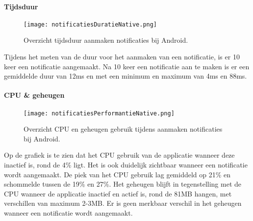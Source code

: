 \paragraph{Tijdsduur}
\begin{figure}[H]
    \centering
    \texttt{[image: notificatiesDuratieNative.png]}
    \caption{Overzicht tijdsduur aanmaken notificaties bij Android.}
\end{figure}
Tijdens het meten van de duur voor het aanmaken van een notificatie, is er 
10 keer een notificatie aangemaakt. Na 10 keer een notificatie aan te maken is er  
een gemiddelde duur van 12ms en met een minimum en 
maximum van 4ms en 88ms.

\paragraph{CPU \& geheugen}
\begin{figure}[H]
    \centering
    \texttt{[image: notificatiesPerformantieNative.png]}
    \caption{Overzicht CPU en geheugen gebruik tijdens aanmaken notificaties bij Android.}
\end{figure}
Op de grafiek is te zien dat het CPU gebruik van de applicatie wanneer deze inactief is, rond de 4\% ligt. 
Het is ook duidelijk zichtbaar wanneer een notificatie wordt aangemaakt. De piek van het CPU gebruik lag 
gemiddeld op 21\% en schommelde tussen de 19\% en 27\%. Het geheugen blijft in tegenstelling met de CPU 
wanneer de applicatie inactief en actief is, rond de 81MB hangen, met verschillen van maximum 2-3MB. Er is geen 
merkbaar verschil in het geheugen wanneer een notificatie wordt aangemaakt.
  
